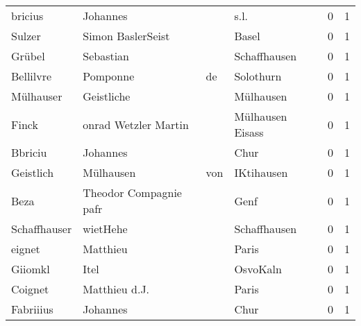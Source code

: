 \begin{center}
\begin{tiny}
\begin{longtabu}{llllrr}
                  bricius &                           Johannes &             &                                        s.l. &          0 &         1 \\
                   Sulzer &                  Simon BaslerSeist &             &                                       Basel &          0 &         1 \\
                   Grübel &                          Sebastian &             &                                Schaffhausen &          0 &         1 \\
                Bellilvre &                           Pomponne &          de &                                   Solothurn &          0 &         1 \\
                Mülhauser &                         Geistliche &             &                                   Mülhausen &          0 &         1 \\
                    Finck &               onrad Wetzler Martin &             &                            Mülhausen Eisass &          0 &         1 \\
                  Bbriciu &                           Johannes &             &                                        Chur &          0 &         1 \\
                Geistlich &                          Mülhausen &         von &                                  IKtihausen &          0 &         1 \\
                     Beza &             Theodor Compagnie pafr &             &                                        Genf &          0 &         1 \\
             Schaffhauser &                           wietHehe &             &                                Schaffhausen &          0 &         1 \\
                   eignet &                           Matthieu &             &                                       Paris &          0 &         1 \\
                  Giiomkl &                               Itel &             &                                    OsvoKaln &          0 &         1 \\
                  Coignet &                      Matthieu d.J. &             &                                       Paris &          0 &         1 \\
                Fabriiius &                           Johannes &             &                                        Chur &          0 &         1 \\

\end{longtabu}
\end{tiny}
\end{center}
